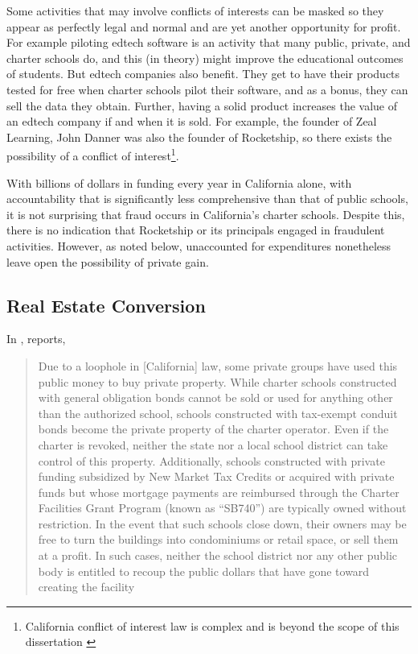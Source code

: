 Some activities that may involve conflicts of interests can be masked so they appear as perfectly legal and normal and are yet another opportunity for profit. For example piloting edtech software is an activity that many public, private, and charter schools do, and this (in theory) might improve the educational outcomes of students. But edtech companies also benefit. They get to have their products tested for free when charter schools pilot their software, and as a bonus, they can sell the data they obtain. Further, having a solid product increases the value of an edtech company if and when it is sold. For example, the founder of Zeal Learning, John Danner was also the founder of Rocketship, so there exists the possibility of a conflict of interest\footnote{California conflict of interest law is complex and is beyond the scope of this dissertation \parencite{Chaney.etal2010}}.

With billions of dollars in funding every year in California alone, with accountability that is significantly less comprehensive than that of public schools, it is not surprising that fraud occurs in California's charter schools. Despite this, there is no indication that Rocketship or its principals engaged in fraudulent activities. However, as noted below, unaccounted for expenditures nonetheless leave open the possibility of private gain. 

\subsection{Real Estate Conversion}%
\label{sec:real-estate-conv}\indent%

In , \citeauthor{ITPI2018} reports,
\blockquote[{\parencite[6]{ITPI2018}}][]{\SingleSpacing\vspace{-0.5\baselineskip}%
Due to a loophole in [California] law, some private groups have used this public money to buy private property. While charter schools constructed with general obligation bonds cannot be sold or used for anything other than the authorized school, schools constructed with tax-exempt conduit bonds become the private property of the charter operator. Even if the charter is revoked, neither the state nor a local school district can take control of this property. Additionally, schools constructed with private funding subsidized by New Market Tax Credits or acquired with private funds but whose mortgage payments are reimbursed through the Charter Facilities Grant Program (known as “SB740”) are typically owned without restriction. In the event that such schools close down, their owners may be free to turn the buildings into condominiums or retail space, or sell them at a profit. In such cases, neither the school district nor any other public body is entitled to recoup the public dollars that have gone toward creating the facility}.

